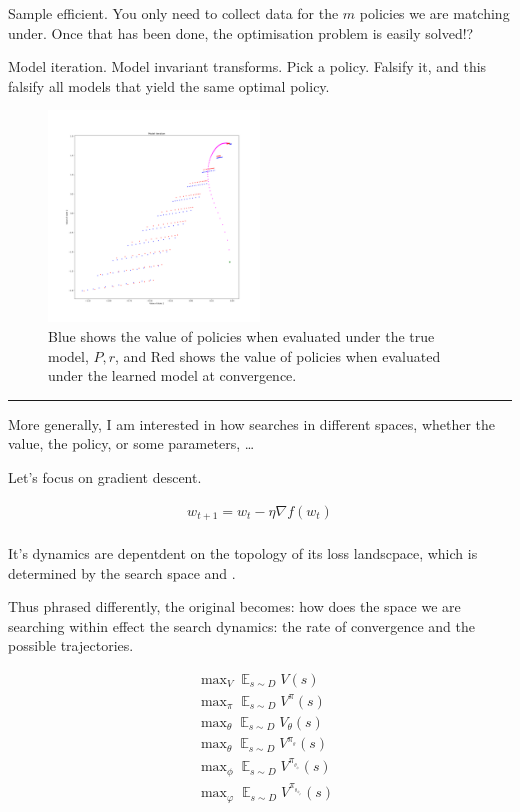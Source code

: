 Sample efficient. You only need to collect data for the $m$ policies we are matching under.
Once that has been done, the optimisation problem is easily solved!?

Model iteration. Model invariant transforms. Pick a policy. Falsify it,
and this falsify all models that yield the same optimal policy.

\begin{figure}
\centering
\includegraphics[width=0.5\textwidth,height=0.5\textheight]{../../pictures/figures/model_iteration.png}
\caption{Blue shows the value of policies when evaluated under the true model, $P, r$,
and Red shows the value of policies when evaluated under the learned model at convergence.}
\end{figure}

\begin{center}\rule{0.5\linewidth}{\linethickness}\end{center}

More generally, I am interested in how searches in different spaces,
whether the value, the policy, or some parameters, \ldots{}

Let's focus on gradient descent.

\begin{align}
w_{t+1} = w_t - \eta \nabla f(w_t) \\
\end{align}

It's dynamics are depentdent on the topology of its loss landscpace,
which is determined by the search space and .

Thus phrased differently, the original becomes: how does the space we
are searching within effect the search dynamics: the rate of convergence
and the possible trajectories.

\begin{align}
&\mathop{\text{max}}_V \mathop{\mathbb E}_{s\sim D} V(s) \\
&\mathop{\text{max}}_{\pi} \mathop{\mathbb E}_{s\sim D}V^{\pi}(s) \\
&\mathop{\text{max}}_{\theta} \mathop{\mathbb E}_{s\sim D} V_{\theta}(s) \\
&\mathop{\text{max}}_{\theta} \mathop{\mathbb E}_{s\sim D} V^{\pi_{_{\theta}}}(s) \\
&\mathop{\text{max}}_{\phi} \mathop{\mathbb E}_{s\sim D} V^{\pi_{_{\theta_{\phi}}}}(s) \\
&\mathop{\text{max}}_{\varphi} \mathop{\mathbb E}_{s\sim D} V^{\pi_{_{\theta_{\phi_{\varphi}}}}}(s) \\
\end{align}

